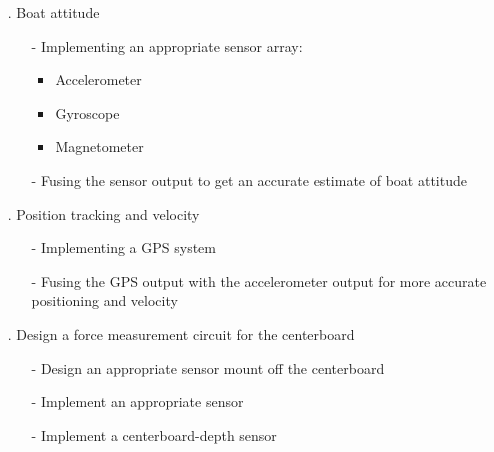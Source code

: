 \begin{itemize}
	\item[.] Boat attitude
	\begin{itemize}
		\item[-] Implementing an appropriate sensor array:
		\begin{itemize}
			\item Accelerometer
			\item Gyroscope
			\item Magnetometer
		\end{itemize}
		\item[-] Fusing the sensor output to get an accurate estimate of boat attitude
	\end{itemize}
	\item[.] Position tracking and velocity
	\begin{itemize}
		\item[-] Implementing a GPS system
		\item[-] Fusing the GPS output with the accelerometer output for more accurate positioning and velocity
	\end{itemize}
	\item[.] Design a force measurement circuit for the centerboard
	\begin{itemize}
		\item[-] Design an appropriate sensor mount off the centerboard
		\item[-] Implement an appropriate sensor
		\item[-] Implement a centerboard-depth sensor
	\end{itemize}
\end{itemize}

